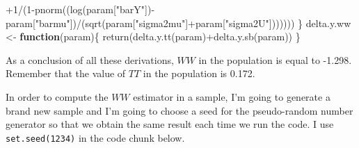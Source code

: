 \documentclass[
]{book}
\newenvironment{Shaded}{\begin{snugshade}}{\end{snugshade}}
\newcommand{\ControlFlowTok}[1]{\textcolor[rgb]{0.13,0.29,0.53}{\textbf{#1}}}
\newcommand{\DecValTok}[1]{\textcolor[rgb]{0.00,0.00,0.81}{#1}}
\newcommand{\FunctionTok}[1]{\textcolor[rgb]{0.00,0.00,0.00}{#1}}
\newcommand{\NormalTok}[1]{#1}
\newcommand{\OtherTok}[1]{\textcolor[rgb]{0.56,0.35,0.01}{#1}}
\newcommand{\SpecialCharTok}[1]{\textcolor[rgb]{0.00,0.00,0.00}{#1}}
\newcommand{\StringTok}[1]{\textcolor[rgb]{0.31,0.60,0.02}{#1}}
\theoremstyle{definition}
\theoremstyle{definition}
\theoremstyle{definition}
\theoremstyle{definition}
\theoremstyle{remark}
\begin{document}
\begin{Shaded}
\begin{Highlighting}[]
           \SpecialCharTok{+}\DecValTok{1}\SpecialCharTok{/}\NormalTok{(}\DecValTok{1}\SpecialCharTok{{-}}\FunctionTok{pnorm}\NormalTok{((}\FunctionTok{log}\NormalTok{(param[}\StringTok{"barY"}\NormalTok{])}\SpecialCharTok{{-}}\NormalTok{param[}\StringTok{"barmu"}\NormalTok{])}\SpecialCharTok{/}\NormalTok{(}\FunctionTok{sqrt}\NormalTok{(param[}\StringTok{"sigma2mu"}\NormalTok{]}\SpecialCharTok{+}\NormalTok{param[}\StringTok{"sigma2U"}\NormalTok{]))))))}
\NormalTok{\}}
\NormalTok{delta.y.ww }\OtherTok{\textless{}{-}} \ControlFlowTok{function}\NormalTok{(param)\{}
  \FunctionTok{return}\NormalTok{(}\FunctionTok{delta.y.tt}\NormalTok{(param)}\SpecialCharTok{+}\FunctionTok{delta.y.sb}\NormalTok{(param))}
\NormalTok{\}}
\end{Highlighting}
\end{Shaded}

As a conclusion of all these derivations, \(WW\) in the population is equal to -1.298.
Remember that the value of \(TT\) in the population is 0.172.

In order to compute the \(WW\) estimator in a sample, I'm going to generate a brand new sample and I'm going to choose a seed for the pseudo-random number generator so that we obtain the same result each time we run the code.
I use \texttt{set.seed(1234)} in the code chunk below.
\end{document}
